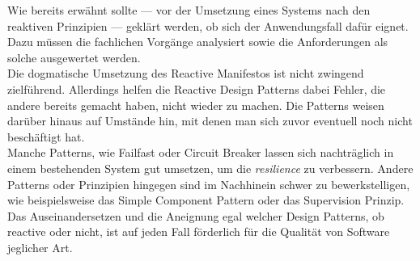 Wie bereits erwähnt sollte --- vor der Umsetzung eines Systems nach den reaktiven Prinzipien --- geklärt werden, ob sich der Anwendungsfall dafür eignet. Dazu müssen die fachlichen Vorgänge analysiert sowie die Anforderungen als solche ausgewertet werden.\\
Die dogmatische Umsetzung des Reactive Manifestos ist nicht zwingend zielführend. Allerdings helfen die Reactive Design Patterns dabei Fehler, die andere bereits gemacht haben, nicht wieder zu machen. Die Patterns weisen darüber hinaus auf Umstände hin, mit denen man sich zuvor eventuell noch nicht beschäftigt hat.\\
Manche Patterns, wie Failfast oder Circuit Breaker lassen sich nachträglich in einem bestehenden System gut umsetzen, um die \textit{resilience} zu verbessern. Andere Patterns oder Prinzipien hingegen sind im Nachhinein schwer zu bewerkstelligen, wie beispielsweise das Simple Component Pattern oder das Supervision Prinzip.
Das Auseinandersetzen und die Aneignung egal welcher Design Patterns, ob reactive oder nicht, ist auf jeden Fall förderlich für die Qualität von Software jeglicher Art.